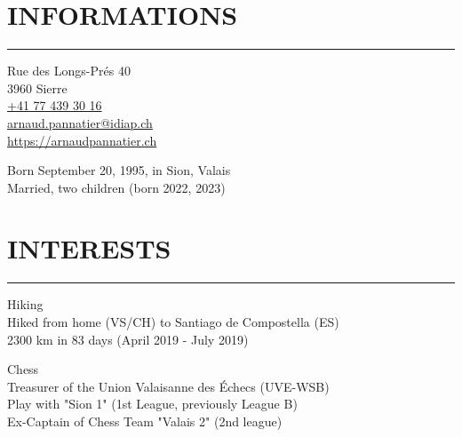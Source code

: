 \documentclass{article}
\let\oldhrule\hrule
\renewcommand{\hrule}{\color{lightgray}\oldhrule\color{black}}
\newcommand{\rubric}[1]{
    \color{mediumgray}

    \section*{\montserratlight \large \MakeUppercase{#1}} 
    \hrule
    \vspace{4mm}
    \raggedright
}
\begin{document}
\begin{minipage}[t]{0.3\textwidth}
  \rubric{Informations}

  \color{deepgray} \small
  Rue des Longs-Prés 40 \\
  3960 Sierre \\

  \href{tel:+41774393016}{+41 77 439 30 16} \\
  \href{mailto:arnaud.pannatier@idiap.ch}{arnaud.pannatier@idiap.ch} \\
  \href{https://arnaudpannatier.ch}{https://arnaudpannatier.ch}  \\

  \vspace{4mm}

  Born September 20, 1995, in Sion, Valais \\
  Married, two children (born 2022, 2023)

\end{minipage}\hfill
\begin{minipage}[t]{0.65\textwidth}
  \rubric{Interests}
  \color{deepgray}
  Hiking \\
  \color{mediumgray} \small
  Hiked from home (VS/CH) to Santiago de Compostella (ES) \\
  2300 km in 83 days (April 2019 - July 2019)
  \vspace{3mm}

  \color{deepgray}
  Chess \\
  \color{mediumgray} \small
  Treasurer of the Union Valaisanne des Échecs (UVE-WSB) \\
  Play with "Sion 1" (1st League, previously League B) \\
  Ex-Captain of Chess Team "Valais 2" (2nd league)

\end{minipage}
\end{document}
